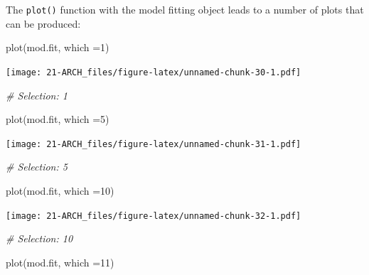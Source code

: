 \documentclass[
]{book}
\newenvironment{Shaded}{\begin{snugshade}}{\end{snugshade}}
\newcommand{\AttributeTok}[1]{\textcolor[rgb]{0.77,0.63,0.00}{#1}}
\newcommand{\CommentTok}[1]{\textcolor[rgb]{0.56,0.35,0.01}{\textit{#1}}}
\newcommand{\DecValTok}[1]{\textcolor[rgb]{0.00,0.00,0.81}{#1}}
\newcommand{\FunctionTok}[1]{\textcolor[rgb]{0.00,0.00,0.00}{#1}}
\newcommand{\NormalTok}[1]{#1}
\theoremstyle{definition}
\theoremstyle{definition}
\theoremstyle{definition}
\theoremstyle{definition}
\theoremstyle{remark}
\begin{document}
The \texttt{plot()} function with the model fitting object leads to a number of plots that can be produced:

\begin{Shaded}
\begin{Highlighting}[]
\FunctionTok{plot}\NormalTok{(mod.fit, }\AttributeTok{which =}\DecValTok{1}\NormalTok{)}
\end{Highlighting}
\end{Shaded}

\texttt{[image: 21-ARCH\_files/figure-latex/unnamed-chunk-30-1.pdf]}

\begin{Shaded}
\begin{Highlighting}[]
\CommentTok{\# Selection: 1}
\end{Highlighting}
\end{Shaded}

\begin{Shaded}
\begin{Highlighting}[]
\FunctionTok{plot}\NormalTok{(mod.fit, }\AttributeTok{which =}\DecValTok{5}\NormalTok{)}
\end{Highlighting}
\end{Shaded}

\texttt{[image: 21-ARCH\_files/figure-latex/unnamed-chunk-31-1.pdf]}

\begin{Shaded}
\begin{Highlighting}[]
\CommentTok{\# Selection: 5}
\end{Highlighting}
\end{Shaded}

\begin{Shaded}
\begin{Highlighting}[]
\FunctionTok{plot}\NormalTok{(mod.fit, }\AttributeTok{which =}\DecValTok{10}\NormalTok{)}
\end{Highlighting}
\end{Shaded}

\texttt{[image: 21-ARCH\_files/figure-latex/unnamed-chunk-32-1.pdf]}

\begin{Shaded}
\begin{Highlighting}[]
\CommentTok{\# Selection: 10}
\end{Highlighting}
\end{Shaded}

\begin{Shaded}
\begin{Highlighting}[]
\FunctionTok{plot}\NormalTok{(mod.fit, }\AttributeTok{which =}\DecValTok{11}\NormalTok{)}
\end{Highlighting}
\end{Shaded}
\end{document}
